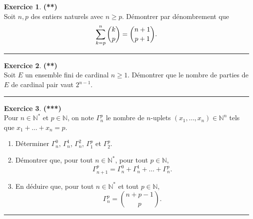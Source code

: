 \documentclass[a4paper,11pt]{article}
\theoremstyle{definition}
\newtheorem{exo}{Exercice} %
\begin{document}
\begin{minipage}{1\linewidth}
\begin{minipage}[c ]{0.48\linewidth}
			

		
		\begin{exo}\textbf{(**)}\quad\\[0.2cm]
			Soit $n,p$ des entiers naturels avec $n\geq p$. Démontrer par dénombrement que
			$$\sum_{k=p}^n \dbinom{k}{p}=\dbinom{n+1}{p+1}.$$	
			
			
			\centering\rule{1\linewidth}{0.6pt}\end{exo}
		
		
		\begin{exo}\textbf{(**)}\quad\\[0.2cm]
			Soit $E$ un ensemble fini de cardinal $n\geq 1$. Démontrer que
			le nombre de parties de $E$ de cardinal pair vaut $2^{n-1}$.
			
			\centering\rule{1\linewidth}{0.6pt}\end{exo}
		
		
		
		\begin{exo}\textbf{(***)}\quad\\[0.2cm]
			Pour $n\in\mathbb N^*$ et $p\in\mathbb N$, on note $\Gamma_n^p$ le nombre de $n$-uplets $(x_1,\dots,x_n)\in\mathbb N^n$ tels que $x_1+\dots+x_n=p$. 
			\begin{enumerate}
				\item Déterminer $\Gamma_n^0$, $\Gamma_n^1$, $\Gamma_n^2$, $\Gamma_1^p$ et $\Gamma_2^p$.
				\item Démontrer que, pour tout $n\in\mathbb N^*$, pour tout $p\in\mathbb N$, 
				$$\Gamma_{n+1}^p=\Gamma_n^0+\Gamma_n^1+\dots+\Gamma_n^p.$$
				\item En déduire que, pour tout $n\in\mathbb N^*$ et tout $p\in\mathbb N$, 
				$$\Gamma_n^p=\binom{n+p-1}p.$$
			\end{enumerate}
			
			\centering\rule{1\linewidth}{0.6pt}\end{exo}

\end{minipage}\end{minipage} 
\end{document}
